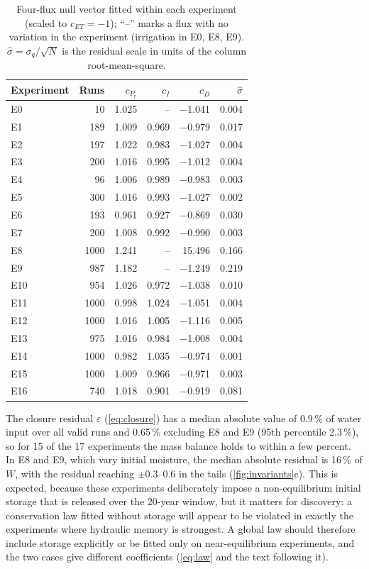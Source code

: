 \documentclass[preprint,12pt,authoryear]{elsarticle}
\begin{document}
\begin{table}[H]\centering\small
\caption{Four-flux null vector fitted within each experiment (scaled to $c_{\mathit{ET}}=-1$); ``--'' marks a flux with no variation in the experiment (irrigation in E0, E8, E9). $\hat\sigma=\sigma_q/\sqrt N$ is the residual scale in units of the column root-mean-square.}
\label{tab:svdexp}
\begin{tabular}{lrrrrr}
\toprule
Experiment & Runs & $c_{P_r}$ & $c_{I}$ & $c_{D}$ & $\hat\sigma$\\\midrule
E0 & 10 & 1.025 & -- & $-$1.041 & 0.004\\
E1 & 189 & 1.009 & 0.969 & $-$0.979 & 0.017\\
E2 & 197 & 1.022 & 0.983 & $-$1.027 & 0.004\\
E3 & 200 & 1.016 & 0.995 & $-$1.012 & 0.004\\
E4 & 96 & 1.006 & 0.989 & $-$0.983 & 0.003\\
E5 & 300 & 1.016 & 0.993 & $-$1.027 & 0.002\\
E6 & 193 & 0.961 & 0.927 & $-$0.869 & 0.030\\
E7 & 200 & 1.008 & 0.992 & $-$0.990 & 0.003\\
E8 & 1000 & 1.241 & -- & 15.496 & 0.166\\
E9 & 987 & 1.182 & -- & $-$1.249 & 0.219\\
E10 & 954 & 1.026 & 0.972 & $-$1.038 & 0.010\\
E11 & 1000 & 0.998 & 1.024 & $-$1.051 & 0.004\\
E12 & 1000 & 1.016 & 1.005 & $-$1.116 & 0.005\\
E13 & 975 & 1.016 & 0.984 & $-$1.008 & 0.004\\
E14 & 1000 & 0.982 & 1.035 & $-$0.974 & 0.001\\
E15 & 1000 & 1.009 & 0.966 & $-$0.971 & 0.003\\
E16 & 740 & 1.018 & 0.901 & $-$0.919 & 0.081\\
\bottomrule
\end{tabular}
\end{table}

The closure residual $\varepsilon$ (\cref{eq:closure}) has a median absolute value of 0.9\,\% of water input over all valid runs and 0.65\,\% excluding E8 and E9 (95th percentile 2.3\,\%), so for 15 of the 17 experiments the mass balance holds to within a few percent. In E8 and E9, which vary initial moisture, the median absolute residual is 16\,\% of $W$, with the residual reaching $\pm0.3$--0.6 in the tails (\cref{fig:invariants}c). This is expected, because these experiments deliberately impose a non-equilibrium initial storage that is released over the 20-year window, but it matters for discovery: a conservation law fitted without storage will appear to be violated in exactly the experiments where hydraulic memory is strongest. A global law should therefore include storage explicitly or be fitted only on near-equilibrium experiments, and the two cases give different coefficients (\cref{eq:law} and the text following it).
\end{document}
